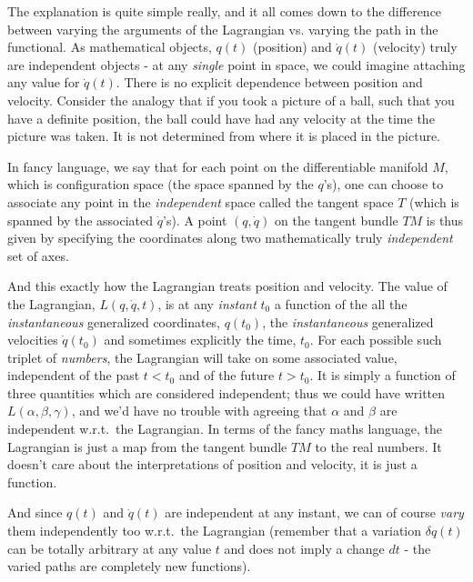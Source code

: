 \documentclass[a4paper]{article}
\begin{document}
    The explanation is quite simple really, and it all comes down to the difference between varying the arguments of the Lagrangian vs. varying the path in the functional. As mathematical objects, \(q(t)\) (position) and \(\dot{q} (t)\) (velocity) truly are independent objects - at any \textit{single} point in space, we could imagine attaching any value for \(\dot{q}(t)\). There is no explicit dependence between position and velocity. Consider the analogy that if you took a picture of a ball, such that you have a definite position, the ball could have had any velocity at the time the picture was taken. It is not determined from where it is placed in the picture.
    
    In fancy language, we say that for each point on the differentiable manifold \(M\), which is configuration space (the space spanned by the \(q\)'s), one can choose to associate any point in the \textit{independent} space called the tangent space \(T\) (which is spanned by the associated \(\dot{q}\)'s). A point \((q, \dot{q})\) on the tangent bundle \(TM\) is thus given by specifying the coordinates along two mathematically truly \textit{independent} set of axes.
    
    And this exactly how the Lagrangian treats position and velocity. The value of the Lagrangian, \(L(q, \dot{q}, t)\), is at any \textit{instant} \(t_0\) a function of the all the \textit{instantaneous} generalized coordinates, \(q(t_0)\), the \textit{instantaneous} generalized velocities \(\dot{q}(t_0)\) and sometimes explicitly the time, \(t_0\). For each possible such triplet of \textit{numbers}, the Lagrangian will take on some associated value, independent of the past \(t < t_0\) and of the future \(t > t_0\). It is simply a function of three quantities which are considered independent; thus we could have written \(L(\alpha, \beta, \gamma)\), and we'd have no trouble with agreeing that \(\alpha\) and \(\beta\) are independent w.r.t.\ the Lagrangian. In terms of the fancy maths language, the Lagrangian is just a map from the tangent bundle \(TM\) to the real numbers. It doesn't care about the interpretations of position and velocity, it is just a function. 
    
    And since \(q(t)\) and \(\dot{q}(t)\) are independent at any instant, we can of course \textit{vary} them independently too w.r.t.\ the Lagrangian (remember that a variation \(\delta q(t)\) can be totally arbitrary at any value \(t\) and does not imply a change \(dt\) - the varied paths are completely new functions).
\end{document}
